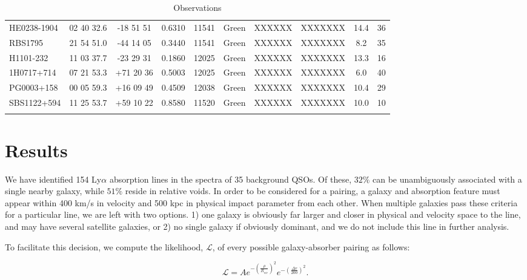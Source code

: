 \documentclass[iop]{emulateapj-rtx4}
\begin{document}
\begin{table}[ht]
\begin{center}
\begin{tabular}{l c c c c c c c c c}
 HE0238-1904 				& 02 40 32.6  &  -18 51 51   &  0.6310 & 11541 & Green	     & XXXXXX & XXXXXXX  &   14.4 &  36  \\
 RBS1795 				& 21 54 51.0  &  -44 14 05   &  0.3440 & 11541	 & Green	     & XXXXXX & XXXXXXX  &     8.2 &  35  \\
 H1101-232 				& 11 03 37.7  &  -23 29 31   &  0.1860 & 12025 & Green  	     & XXXXXX & XXXXXXX  &   13.3 &  16  \\
 1H0717+714 				& 07 21 53.3  &  +71 20 36  &  0.5003 & 12025	 & Green	     & XXXXXX & XXXXXXX  &     6.0 &  40  \\
 PG0003+158 				& 00 05 59.3  &  +16 09 49  &  0.4509 & 12038 & Green	     & XXXXXX & XXXXXXX  &   10.4 &  29  \\
 SBS1122+594 			& 11 25 53.7  &  +59 10 22  &  0.8580 & 11520	 & Green	     & XXXXXX & XXXXXXX  &   10.0 &  10  \\
 \\
\hline

\end{tabular}
\end{center}
  \caption{\small{Observations}}
  \label{target_table}
\end{table}


\section{Results}

We have identified 154 Ly$\alpha$ absorption lines in the spectra of 35 background QSOs. Of these, $32\%$ can be unambiguously associated with a single nearby galaxy, while $51\%$ reside in relative voids. In order to be considered for a pairing, a galaxy and absorption feature must appear within 400 km/s in velocity and 500 kpc in physical impact parameter from each other. When multiple galaxies pass these criteria for a particular line, we are left with two options. 1) one galaxy is obviously far larger and closer in physical and velocity space to the line, and may have several satellite galaxies, or 2) no single galaxy if obviously dominant, and we do not include this line in further analysis. 

To facilitate this decision, we compute the likelihood, $\mathcal{L}$, of every possible galaxy-absorber pairing as follows:

\begin{equation}
	\mathcal{L} = A e^{-(\frac{\rho}{R_{vir}})^2} e^{-(\frac{\Delta v}{200})^2}.
\end{equation}
\end{document}

